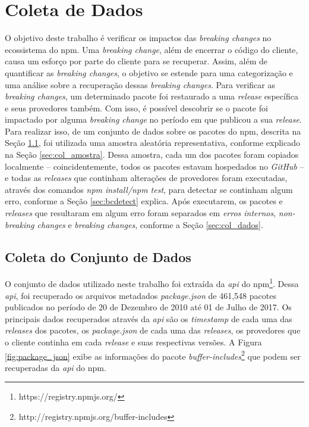 \chapter{Coleta de Dados}
\label{cap:metodologia}

O objetivo deste trabalho é verificar os impactos das \textit{breaking changes} no ecossistema do \gls{npm}. Uma \textit{breaking change}, além de encerrar o código do cliente, causa um esforço por parte do cliente para se recuperar. Assim, além de quantificar as \textit{breaking changes}, o objetivo se estende para uma categorização e uma análise sobre a recuperação dessas \textit{breaking changes}. Para verificar as \textit{breaking changes}, um determinado pacote foi restaurado a uma \textit{release} específica e seus provedores também. Com isso, é possível descobrir se o pacote foi impactado por alguma \textit{breaking change} no período em que publicou a sua \textit{release}. Para realizar isso, de um conjunto de dados sobre os pacotes do \gls{npm}, descrita na Seção \ref{sec:col_base}, foi utilizada uma amostra aleatória representativa, conforme explicado na Seção \ref{sec:col_amostra}. Dessa amostra, cada um dos pacotes foram copiados localmente -- coincidentemente, todos os pacotes estavam hospedados no \textit{GitHub} -- e todas as \textit{releases} que continham alterações de provedores foram executadas, através dos comandos \textit{npm install/npm test}, para detectar se continham algum erro, conforme a Seção \ref{sec:bcdetect} explica. Após executarem, os pacotes e \textit{releases} que resultaram em algum erro foram separados em \textit{erros internos}, \textit{non-breaking changes} e \textit{breaking changes}, conforme a Seção \ref{sec:col_dados}.

\section{Coleta do Conjunto de Dados}
\label{sec:col_base}
O conjunto de dados utilizado neste trabalho foi extraída da \textit{api} do \gls{npm}\footnote{https://registry.npmjs.org/}. Dessa \textit{api}, foi recuperado os arquivos metadados \textit{package.json} de 461,548 pacotes publicados no período de 20 de Dezembro de 2010 até 01 de Julho de 2017. Os principais dados recuperados através da \textit{api} são os \textit{timestamp} de cada uma das \textit{releases} dos pacotes, os \textit{package.json} de cada uma das \textit{releases}, os provedores que o cliente continha em cada \textit{release} e suas respectivas versões. A Figura \ref{fig:package_json} exibe as informações do pacote \textit{buffer-includes}\footnote{http://registry.npmjs.org/buffer-includes} que podem ser recuperadas da \textit{api} do \gls{npm}.

